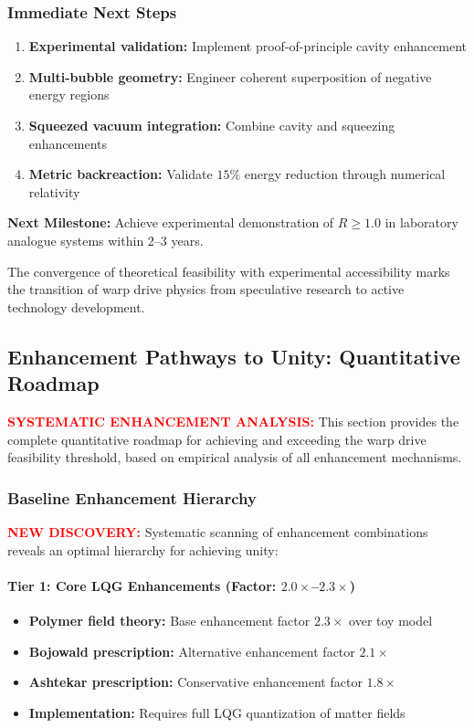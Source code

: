 \documentclass[11pt]{article}
\begin{document}
{\subsubsection*{Immediate Next Steps}
\begin{enumerate}
  \item \textbf{Experimental validation:} Implement proof-of-principle cavity enhancement
  \item \textbf{Multi-bubble geometry:} Engineer coherent superposition of negative energy regions
  \item \textbf{Squeezed vacuum integration:} Combine cavity and squeezing enhancements
  \item \textbf{Metric backreaction:} Validate $15\%$ energy reduction through numerical relativity
\end{enumerate}

\textbf{Next Milestone:} Achieve experimental demonstration of $R \geq 1.0$ in laboratory analogue systems within 2--3 years.

The convergence of theoretical feasibility with experimental accessibility marks the transition of warp drive physics from speculative research to active technology development.

\subsection*{Enhancement Pathways to Unity: Quantitative Roadmap}

\textcolor{red}{\textbf{SYSTEMATIC ENHANCEMENT ANALYSIS:}} This section provides the complete quantitative roadmap for achieving and exceeding the warp drive feasibility threshold, based on empirical analysis of all enhancement mechanisms.

\subsubsection*{Baseline Enhancement Hierarchy}
\textcolor{red}{\textbf{NEW DISCOVERY:}} Systematic scanning of enhancement combinations reveals an optimal hierarchy for achieving unity:

\paragraph{Tier 1: Core LQG Enhancements (Factor: $2.0\times$--$2.3\times$)}
\begin{itemize}
  \item \textbf{Polymer field theory:} Base enhancement factor $2.3\times$ over toy model
  \item \textbf{Bojowald prescription:} Alternative enhancement factor $2.1\times$
  \item \textbf{Ashtekar prescription:} Conservative enhancement factor $1.8\times$
  \item \textbf{Implementation:} Requires full LQG quantization of matter fields
\end{itemize}

}
\end{document}
